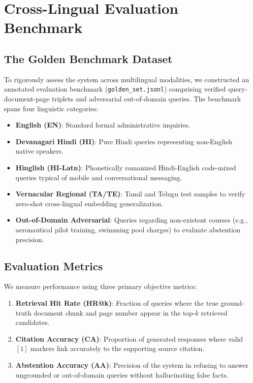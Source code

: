 \documentclass[conference]{IEEEtran}
\begin{document}
\section{Cross-Lingual Evaluation Benchmark}

\subsection{The Golden Benchmark Dataset}
To rigorously assess the system across multilingual modalities, we constructed an annotated evaluation benchmark (\texttt{golden\_set.jsonl}) comprising verified query-document-page triplets and adversarial out-of-domain queries. The benchmark spans four linguistic categories:
\begin{itemize}
    \item \textbf{English (EN)}: Standard formal administrative inquiries.
    \item \textbf{Devanagari Hindi (HI)}: Pure Hindi queries representing non-English native speakers.
    \item \textbf{Hinglish (HI-Latn)}: Phonetically romanized Hindi-English code-mixed queries typical of mobile and conversational messaging.
    \item \textbf{Vernacular Regional (TA/TE)}: Tamil and Telugu test samples to verify zero-shot cross-lingual embedding generalization.
    \item \textbf{Out-of-Domain Adversarial}: Queries regarding non-existent courses (e.g., aeronautical pilot training, swimming pool charges) to evaluate abstention precision.
\end{itemize}

\subsection{Evaluation Metrics}
We measure performance using three primary objective metrics:
\begin{enumerate}
    \item \textbf{Retrieval Hit Rate (HR@k)}: Fraction of queries where the true ground-truth document chunk and page number appear in the top-$k$ retrieved candidates.
    \item \textbf{Citation Accuracy (CA)}: Proportion of generated responses where valid $[1]$ markers link accurately to the supporting source citation.
    \item \textbf{Abstention Accuracy (AA)}: Precision of the system in refusing to answer ungrounded or out-of-domain queries without hallucinating false facts.
\end{enumerate}
\end{document}
